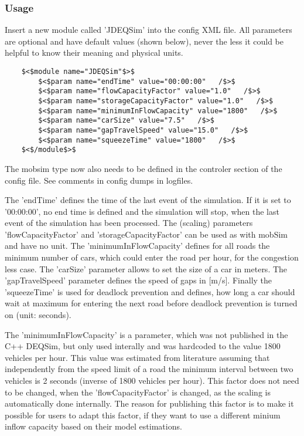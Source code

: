 \documentclass[a4paper,11pt]{report}
\begin{document}
\subsubsection{Usage}

Insert  a new module called 'JDEQSim' into the config XML file. All parameters  are optional and have default values (shown below), never the less it  could be helpful to know their meaning and physical units.
\begin{verbatim}
	$<$module name="JDEQSim"$>$
		$<$param name="endTime" value="00:00:00"   /$>$
		$<$param name="flowCapacityFactor" value="1.0"   /$>$
		$<$param name="storageCapacityFactor" value="1.0"   /$>$
		$<$param name="minimumInFlowCapacity" value="1800"   /$>$
		$<$param name="carSize" value="7.5"   /$>$
		$<$param name="gapTravelSpeed" value="15.0"   /$>$
		$<$param name="squeezeTime" value="1800"   /$>$
	$<$/module$>$
\end{verbatim}The mobsim type now  also needs to be defined in the controler section of the config  file. See comments in config dumps in logfiles.

The  'endTime' defines the time of the last event of the simulation. If it is  set to '00:00:00', no end time is defined and the simulation will stop,  when the last event of the simulation has been processed. The (scaling)  parameters  'flowCapacityFactor' and 'storageCapacityFactor' can  be used as with mobSim and have no unit. The 'minimumInFlowCapacity'  defines for all roads the minimum number of cars, which could enter the  road per hour, for the congestion less case. The 'carSize' parameter  allows to set the size of a car in meters. The 'gapTravelSpeed'  parameter defines the speed of gaps in [m/s]. Finally the 'squeezeTime'  is used for deadlock prevention and defines, how long a car should wait  at maximum for entering the next road before deadlock prevention is  turned on (unit: seconds).

The 'minimumInFlowCapacity' is a  parameter, which was not published in the C++ DEQSim, but only used  interally and was hardcoded to the value 1800 vehicles per hour. This  value was estimated from literature assuming that independently from the  speed limit of a road the minimum interval between two vehicles is 2  seconds (inverse of 1800 vehicles per hour). This factor does not need  to be changed, when the 'flowCapacityFactor' is changed, as the scaling  is automatically done internally. The reason for publishing this factor  is to make it possible for users to adapt this factor, if they want to  use a different minium inflow capacity based on their model estimations.
\end{document}
